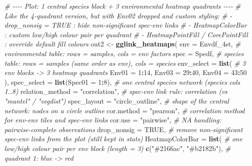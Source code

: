 \documentclass[
]{book}
\newenvironment{Shaded}{\begin{snugshade}}{\end{snugshade}}
\newcommand{\AttributeTok}[1]{\textcolor[rgb]{0.13,0.29,0.53}{#1}}
\newcommand{\CommentTok}[1]{\textcolor[rgb]{0.56,0.35,0.01}{\textit{#1}}}
\newcommand{\ConstantTok}[1]{\textcolor[rgb]{0.56,0.35,0.01}{#1}}
\newcommand{\DecValTok}[1]{\textcolor[rgb]{0.00,0.00,0.81}{#1}}
\newcommand{\FunctionTok}[1]{\textcolor[rgb]{0.13,0.29,0.53}{\textbf{#1}}}
\newcommand{\NormalTok}[1]{#1}
\newcommand{\OtherTok}[1]{\textcolor[rgb]{0.56,0.35,0.01}{#1}}
\newcommand{\SpecialCharTok}[1]{\textcolor[rgb]{0.81,0.36,0.00}{\textbf{#1}}}
\newcommand{\StringTok}[1]{\textcolor[rgb]{0.31,0.60,0.02}{#1}}
\begin{document}
\begin{Shaded}
\begin{Highlighting}[]
\CommentTok{\# {-}{-}{-}{-} Plot: 1 central species block + 3 environmental heatmap quadrants {-}{-}{-}{-}}
\CommentTok{\# Like the 4{-}quadrant version, but with Env02 dropped and custom styling:}
\CommentTok{\#   {-} drop\_nonsig = TRUE     : hide non{-}significant spec{-}env links}
\CommentTok{\#   {-} HeatmapColorBar        : custom low/high colour pair per quadrant}
\CommentTok{\#   {-} HeatmapPointFill / CorePointFill : override default fill colours}
\NormalTok{out2 }\OtherTok{\textless{}{-}} \FunctionTok{gglink\_heatmaps}\NormalTok{(}
  \AttributeTok{env                =}\NormalTok{ Envdf\_4st,           }\CommentTok{\# environmental table: rows = samples, cols = env factors}
  \AttributeTok{spec               =}\NormalTok{ Spedf,               }\CommentTok{\# species table: rows = samples (same order as env), cols = species}
  \AttributeTok{env\_select         =} \FunctionTok{list}\NormalTok{(                }\CommentTok{\# 3 env blocks {-}\textgreater{} 3 heatmap quadrants}
    \AttributeTok{Env01 =} \DecValTok{1}\SpecialCharTok{:}\DecValTok{14}\NormalTok{,}
    \AttributeTok{Env03 =} \DecValTok{29}\SpecialCharTok{:}\DecValTok{40}\NormalTok{,}
    \AttributeTok{Env04 =} \DecValTok{43}\SpecialCharTok{:}\DecValTok{50}
\NormalTok{  ),}
  \AttributeTok{spec\_select        =} \FunctionTok{list}\NormalTok{(}\AttributeTok{Spec01 =} \DecValTok{1}\SpecialCharTok{:}\DecValTok{8}\NormalTok{),  }\CommentTok{\# one central species network (species cols 1..8)}
  \AttributeTok{relation\_method    =} \StringTok{"correlation"}\NormalTok{,       }\CommentTok{\# spec{-}env link rule: correlation (vs "mantel" / "vegdist")}
  \AttributeTok{spec\_layout        =} \StringTok{"circle\_outline"}\NormalTok{,    }\CommentTok{\# shape of the central network: nodes on a circle outline}
  \AttributeTok{cor.method         =} \StringTok{"pearson"}\NormalTok{,           }\CommentTok{\# correlation method for env{-}env tiles and spec{-}env links}
  \AttributeTok{cor.use            =} \StringTok{"pairwise"}\NormalTok{,          }\CommentTok{\# NA handling: pairwise{-}complete observations}
  \AttributeTok{drop\_nonsig        =} \ConstantTok{TRUE}\NormalTok{,                }\CommentTok{\# remove non{-}significant spec{-}env links from the plot (still kept in stats)}
  \AttributeTok{HeatmapColorBar    =} \FunctionTok{list}\NormalTok{(                }\CommentTok{\# one low/high colour pair per env block (length = 3)}
    \FunctionTok{c}\NormalTok{(}\StringTok{"\#2166ac"}\NormalTok{, }\StringTok{"\#b2182b"}\NormalTok{),  }\CommentTok{\# quadrant 1: blue {-}\textgreater{} red}

\end{Highlighting}
\end{Shaded}
\end{document}

